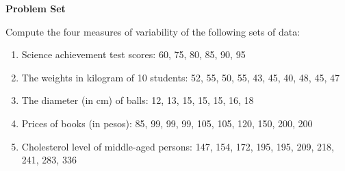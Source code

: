 \textbf{Problem Set}

\vspce

Compute the four measures of variability of the following sets of data: 
\begin{enumerate}[label = \arabic*. ]
\item Science achievement test scores: 60, 75, 80, 85, 90, 95 
\item The weights in kilogram of 10 students: 52, 55, 50, 55, 43, 45, 40, 48, 45, 47
\item The diameter (in cm)  of balls: 12, 13, 15, 15, 15, 16, 18
\item Prices of books (in pesos): 85, 99, 99, 99, 105, 105, 120, 150, 200, 200
\item Cholesterol level of middle-aged persons: 147, 154, 172, 195, 195, 209, 218, 241, 283, 336
\end{enumerate} 
 
 
 
 
 